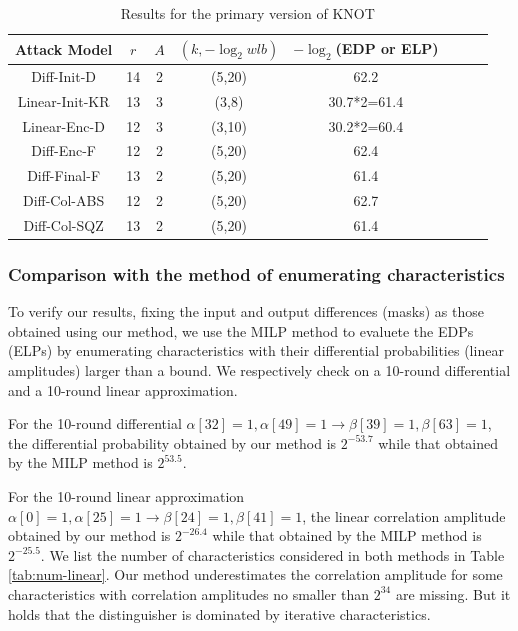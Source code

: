 \begin{table}
	\caption{Results for the primary version of KNOT}\label{tab:knot}
	\centering
	\begin{tabular}{|c|c|c|c|c|c|c|c|}
		\hline
		Attack Model & $r$ & $A$ & $(k,-\log_2wlb)$ & $-\log_2$(EDP or ELP)\\
		\hline
		Diff-Init-D & 14 & 2 & (5,20) & 62.2 \\
		Linear-Init-KR & 13 & 3 & (3,8) & 30.7*2=61.4 \\
		Linear-Enc-D & 12 & 3 & (3,10) & 30.2*2=60.4 \\
		Diff-Enc-F & 12 & 2 & (5,20) & 62.4 \\
		Diff-Final-F & 13 & 2 & (5,20) & 61.4 \\
		Diff-Col-ABS & 12 & 2 & (5,20) & 62.7 \\
		Diff-Col-SQZ & 13 & 2 & (5,20) & 61.4 \\
		\hline
	\end{tabular}
\end{table}

\subsubsection{Comparison with the method of enumerating characteristics}

To verify our results, fixing the input and output differences (masks) as those obtained using our method, we use the MILP method to evaluete the EDPs (ELPs) by enumerating characteristics with their differential probabilities (linear amplitudes) larger than a bound. We respectively check on a 10-round differential and a 10-round linear approximation.

For the 10-round differential $\alpha[32]=1,\alpha[49]=1\rightarrow \beta[39]=1,\beta[63]=1$, the differential probability obtained by our method is $2^{-53.7}$ while that obtained by the MILP method is $2^{53.5}$. 

For the 10-round linear approximation $\alpha[0]=1,\alpha[25]=1\rightarrow \beta[24]=1,\beta[41]=1$, the linear correlation amplitude obtained by our method is $2^{-26.4}$ while that obtained by the MILP method is $2^{-25.5}$. We list the number of characteristics considered in both methods in Table \ref{tab:num-linear}. Our method underestimates the correlation amplitude for some characteristics with correlation amplitudes no smaller than $2^{34}$ are missing. But it holds that the distinguisher is dominated by iterative characteristics. 

